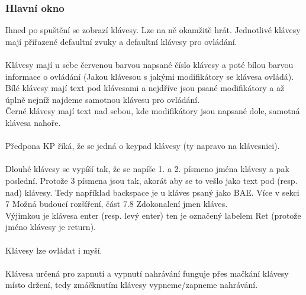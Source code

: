\documentclass[12pt]{article}
\begin{document}
	\subsubsection{Hlavní okno}
	Ihned po spuštění se zobrazí klávesy. Lze na ně okamžitě hrát. Jednotlivé klávesy mají přiřazené defaultní zvuky a defaultní klávesy pro ovládání. 
	\\
	\\
	Klávesy mají u sebe červenou barvou napsané číslo klávesy a poté bílou barvou informace o ovládání (Jakou klávesou s jakými modifikátory se klávesa ovládá). 
	\\
	Bílé klávesy mají text pod klávesami a nejdříve jsou psané modifikátory a až úplně nejníž najdeme samotnou klávesu pro ovládání.
	\\
	Černé klávesy mají text nad sebou, kde modifikátory jsou napsané dole, samotná klávesa nahoře. 
	\\
	\\
	Předpona KP říká, že se jedná o keypad klávesy (ty napravo na klávesnici).
	\\
	\\
	Dlouhé klávesy se vypíší tak, že se napíše 1. a 2. písmeno jména klávesy a pak poslední. Protože 3 písmena jsou tak, akorát aby se to vešlo jako text pod (resp. nad) klávesy. Tedy například backspace je u kláves psaný jako BAE. Více v sekci 7 Možná budoucí rozšíření, část 7.8 Zdokonalení jmen kláves.
	\\
	Výjimkou je klávesa enter (resp. levý enter) ten je označený labelem Ret (protože jméno klávesy je return).
	\\
	\\
	Klávesy lze ovládat i myší.
	\\
	\\
	Klávesa určená pro zapnutí a vypnutí nahrávání funguje přes mačkání klávesy místo držení, tedy zmáčknutím klávesy vypneme/zapneme nahrávání.
\end{document}
